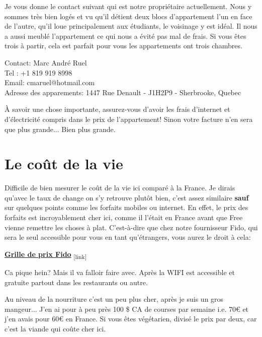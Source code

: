 Je vous donne le contact suivant qui est notre propriétaire actuellement. Nous y sommes très bien logés et vu qu’il détient deux blocs d’appartement l’un en face de l’autre, qu’il loue principalement aux étudiants, le voisinage y est idéal. Il nous a aussi meublé l’appartement ce qui nous a évité pas mal de frais. Si vous êtes trois à partir, cela est parfait pour vous les appartements ont trois chambres.

\bigbreak
Contact: Marc André Ruel \\
Tel : +1 819 919 8998 \\
Email: cmaruel@hotmail.com \\
Adresse des apparements: 1447 Rue Denault - J1H2P9 - Sherbrooke, Quebec
\bigbreak

À savoir une chose importante, assurez-vous d’avoir les frais d’internet et d’électricité compris dans le prix de l’appartement! Sinon votre facture n’en sera que plus grande... Bien plus grande.



\section{Le coût de la vie}\label{sec:sec4.4}

Difficile de bien mesurer le coût de la vie ici comparé à la France. Je dirais qu’avec le taux de change on s’y retrouve plutôt bien, c’est assez similaire \textbf{sauf} sur quelques points comme les forfaits mobiles ou internet.
En effet, le prix des forfaits est incroyablement cher ici, comme il l’était en France avant que Free vienne remettre les choses à plat. C’est-à-dire que chez notre fournisseur Fido, qui sera le seul accessible pour vous en tant qu’étrangers, vous aurez le droit à cela:

\bigbreak
\href{Annexes/Sherbrooke/Forfait_Fido.pdf}{\textbf{Grille de prix Fido}}\textsubscript{  [link]}
\bigbreak

Ca pique hein? Mais il va falloir faire avec. Après la WIFI est accessible et gratuite partout dans les restaurants ou autre.

\bigbreak

Au niveau de la nourriture c’est un peu plus cher, après je suis un gros mangeur... J’en ai pour à peu près 100 \$ CA de courses par semaine i.e. 70\euro{} et j’en avais pour 60\euro{} en France. Si vous êtes végétarien, divisé le prix par deux, car c’est la viande qui coûte cher ici.

